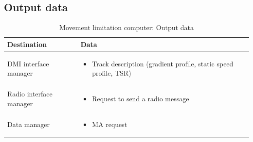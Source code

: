 \documentclass[nocc]{template/openetcs_report}
\begin{document}
\subsection{Output data}
			\begin{longtable}{|l|l|}
				\caption{Movement limitation computer: Output data}\\ 
				\hline
				
					\begin{minipage}[t]{0.35\linewidth} \textbf{Destination}	\end{minipage} 
				&	\begin{minipage}[t]{0.65\linewidth} \textbf{Data} \end{minipage} \\
				
				\hline
																																									
					\begin{minipage}[t]{0.35\linewidth} DMI interface manager	\end{minipage} 
				&	\begin{minipage}[t]{0.65\linewidth}
						\begin{itemize}
							\item Track description (gradient profile, static speed profile, TSR)
						\end{itemize}
					\end{minipage} \\
				
				\hline
				
					\begin{minipage}[t]{0.35\linewidth} Radio interface manager	\end{minipage} 
				&	\begin{minipage}[t]{0.65\linewidth}
						\begin{itemize}
							\item Request to send a radio message
						\end{itemize}			
					\end{minipage} \\
				
				\hline
					
					\begin{minipage}[t]{0.35\linewidth} Data manager	\end{minipage} 
				&	\begin{minipage}[t]{0.65\linewidth}
						\begin{itemize}
							\item MA request
						\end{itemize}			
					\end{minipage} \\
				

\end{longtable}
\end{document}
